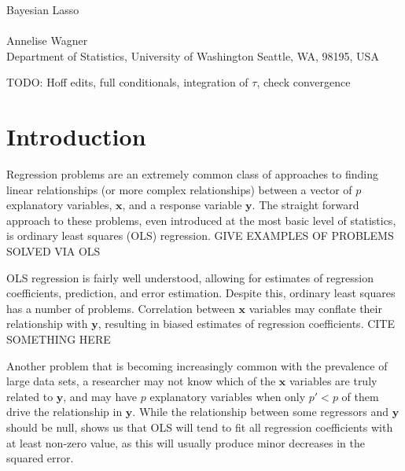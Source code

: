 \documentclass{uwstat572}
\begin{document}

\begin{center}
  {\LARGE Bayesian Lasso}\\\ \\
  {Annelise Wagner \\ 
    Department of Statistics, University of Washington Seattle, WA, 98195, USA
  }
\end{center}

\begin{abstract}
  The Bayesian Lasso, building on the interpretation of Tibshirani, places Laplace priors on linear regression coefficients to allow for Bayesian approaches to parameter and error estimation. An efficient Gibbs sampler allows for quick computation and may be extended to other forms of penalized regression.
\end{abstract}

TODO: Hoff edits, full conditionals, integration of $\tau$, check convergence

\section{Introduction}\label{Introduction}
Regression problems are an extremely common class of approaches to finding linear relationships (or more complex relationships) between a vector of $p$ explanatory variables, $\mathbf{x}$, and a response variable $\mathbf{y}$. The straight forward approach to these problems, even introduced at the most basic level of statistics, is ordinary least squares (OLS) regression. GIVE EXAMPLES OF PROBLEMS SOLVED VIA OLS

OLS regression is fairly well understood, allowing for estimates of regression coefficients, prediction, and error estimation. Despite this, ordinary least squares has a number of problems. Correlation between $\mathbf{x}$ variables may conflate their relationship with $\mathbf{y}$, resulting in biased estimates of regression coefficients. CITE SOMETHING HERE

Another problem that is becoming increasingly common with the prevalence of large data sets, a researcher may not know which of the $\mathbf{x}$ variables are truly related to $\mathbf{y}$, and may have $p$ explanatory variables when only $p'<p$ of them drive the relationship in $\mathbf{y}$. While the relationship between some regressors and $\mathbf{y}$ should be null, \cite{seeger2008bayesian} shows us that OLS will tend to fit all regression coefficients with at least non-zero value, as this will usually produce minor decreases in the squared error.
\end{document}
